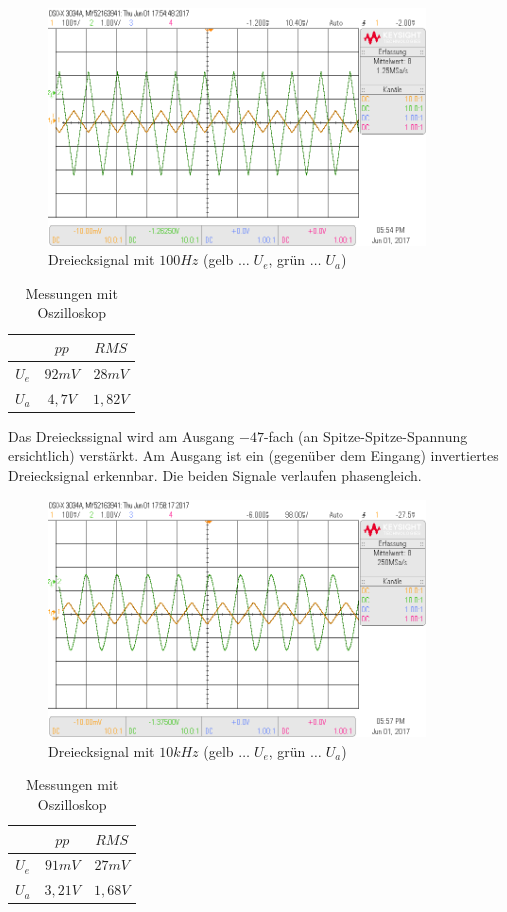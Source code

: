 \documentclass[12pt,a4paper,titlepage]{article}
\begin{document}
\begin{figure}[H]
  \centering
  \includegraphics[width=100mm]{scope_5.png}
  \caption{Dreiecksignal mit $100Hz$ (gelb $\hdots\;U_e$, grün $\hdots\;U_a$)}
\end{figure}

\begin{table}[H]
  \centering
  \begin{tabular}{c|c|c}
     & $pp$ & $RMS$ \\
     \hline
    $U_{e}$ & $92mV$ & $28mV$ \\
    \hline
    $U_{a}$ & $4,7V$ & $1,82V$
  \end{tabular}
  \caption{Messungen mit Oszilloskop}
\end{table}

\noindent Das Dreieckssignal wird am Ausgang $-47$-fach (an Spitze-Spitze-Spannung ersichtlich) verstärkt. Am Ausgang ist ein (gegenüber dem Eingang) invertiertes Dreiecksignal erkennbar. Die beiden Signale verlaufen phasengleich.

\begin{figure}[H]
  \centering
  \includegraphics[width=100mm]{scope_7.png}
  \caption{Dreiecksignal mit $10kHz$ (gelb $\hdots\;U_e$, grün $\hdots\;U_a$)}
\end{figure}

\begin{table}[H]
  \centering
  \begin{tabular}{c|c|c}
     & $pp$ & $RMS$ \\
     \hline
    $U_{e}$ & $91mV$ & $27mV$ \\
    \hline
    $U_{a}$ & $3,21V$ & $1,68V$
  \end{tabular}
  \caption{Messungen mit Oszilloskop}
\end{table}
\end{document}
